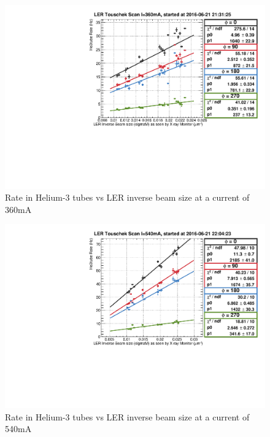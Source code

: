 \begin{figure}[htb]
	\centerfloat
		\includegraphics[trim={0 0 0 0.75cm},clip, scale=0.6]{images/13006}
	\caption{Rate in Helium-3 tubes vs LER inverse beam size at a current of 360mA}	
	\label{fig:TousLER13006}
\end{figure}

\begin{figure}[htb]
	\centerfloat
		\includegraphics[trim={0 0 0 0.75cm},clip, scale=0.6]{images/13007}
	\caption{Rate in Helium-3 tubes vs LER inverse beam size at a current of 540mA}	
	\label{fig:TousLER13007}
\end{figure}



